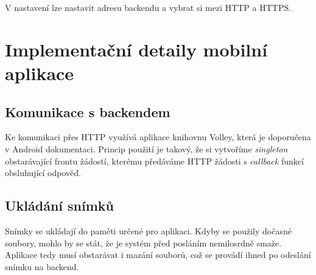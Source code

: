 V nastavení lze nastavit adresu backendu a vybrat si mezi HTTP a HTTPS.

\section{Implementační detaily mobilní aplikace}

\subsection{Komunikace s backendem}

\noindent
Ke komunikaci přes HTTP využívá aplikace knihovnu Volley, která je doporučena
v Android dokumentaci. Princip použití je takový, že si vytvoříme
\textit{singleton} obstarávající frontu žádostí, kterému předáváme HTTP žádosti s
\textit{callback} funkcí obsluhující odpověď. \citep[viz][]{Volley1}

\subsection{Ukládání snímků}

\noindent
Snímky se ukládají do paměti určené pro aplikaci. Kdyby se použily dočasné soubory,
mohlo by se stát, že je systém před posláním nemilosrdně smaže.
\citep[viz][]{AndroidMem}
Aplikace tedy musí obstarávat i mazání souborů, což se provádí
ihned po odeslání snímku na backend.

